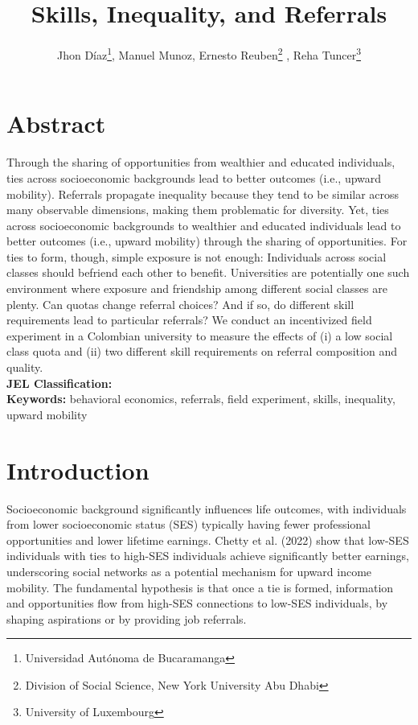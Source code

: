 \documentclass[11pt,a4paper,oneside]{article}
\title{Skills, Inequality, and Referrals}
\author{Jhon Díaz\footnote{Universidad Autónoma de Bucaramanga}, Manuel Munoz\footremember{liser}{Luxembourg Institute of Socio-Economic Research}, Ernesto Reuben\footnote{Division of Social Science, New York University Abu Dhabi} \footrecall{liser}, Reha Tuncer\footnote{University of Luxembourg}}
\begin{document}
\maketitle



\section*{Abstract}

Through the sharing of opportunities from wealthier and educated individuals, ties across socioeconomic backgrounds lead to better outcomes (i.e., upward mobility). 
Referrals propagate inequality because they tend to be similar across many observable dimensions, making them problematic for diversity. Yet, ties across socioeconomic backgrounds to wealthier and educated individuals lead to better outcomes (i.e., upward mobility) through the sharing of opportunities. For ties to form, though, simple exposure is not enough: Individuals across social classes should befriend each other to benefit. Universities are potentially one such environment where exposure and friendship among different social classes are plenty. Can quotas change referral choices? And if so, do different skill requirements lead to particular referrals? We conduct an incentivized field experiment in a Colombian university to measure the effects of (i) a low social class quota and (ii) two different skill requirements on referral composition and quality. \medskip \\
\textbf{JEL Classification:} \\
\textbf{Keywords:} behavioral economics, referrals, field experiment, skills, inequality, upward mobility

\section{Introduction}

Socioeconomic background significantly influences life outcomes, with individuals from lower socioeconomic status (SES) typically having fewer professional opportunities and lower lifetime earnings. Chetty et al. (2022) show that low-SES individuals with ties to high-SES individuals achieve significantly better earnings, underscoring social networks as a potential mechanism for upward income mobility. The fundamental hypothesis is that once a tie is formed, information and opportunities flow from high-SES connections to low-SES individuals, by shaping aspirations or by providing job referrals.
\end{document}
